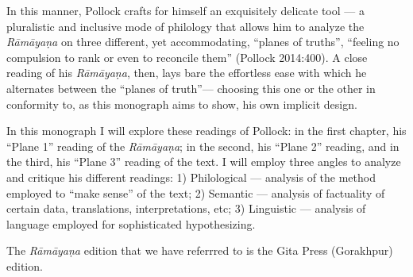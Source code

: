 In this manner, Pollock crafts for himself an exquisitely delicate tool --- a pluralistic and inclusive mode of philology that allows him to analyze the {\sl Rāmāyaṇa} on three different, yet accommodating, “planes of truths”, “feeling no compulsion to rank or even to reconcile them” (Pollock 2014:400). A close reading of his {\sl Rāmāyaṇa}, then, lays bare the effortless ease with which he alternates between the “planes of truth”--- choosing this one or the other in conformity to, as this monograph aims to show, his own implicit design. 

In this monograph I will explore these readings of Pollock: in the first chapter, his “Plane 1” reading of the {\sl Rāmāyaṇa}; in the second, his “Plane 2” reading, and in the third, his “Plane 3” reading of the text. I will employ three angles to analyze and critique his different readings: 1) Philological --- analysis of the method employed to “make sense” of the text; 2) Semantic --- analysis of factuality of certain data, translations, interpretations, etc; 3) Linguistic --- analysis of language employed for sophisticated hypothesizing.

The {\sl Rāmāyaṇa} edition that we have referrred to is the Gita Press (Gorakhpur) edition.

\theendnotes
